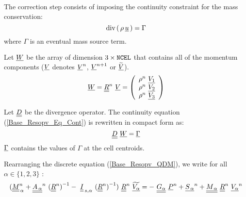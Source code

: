 The correction step consists of imposing the continuity constraint for the mass conservation:
\begin{equation}\label{Base_Resopv_Eq_Cont}
\text{div}\,(\,{\rho\,\underline{u}}\,) = \Gamma
\end{equation}
where $\Gamma$ is an eventual mass source term.

Let $\underline{W}$ be the array of dimension $3 \times \text{\texttt{NCEL}}$ that contains all of the momentum components ($\underline{V}$ denotes $\underline{V}^n$, $\underline{V}^{n+1}$ or $\widetilde{\underline{V}}$).
$$ \underline{W} = \underline{\underline{R}}^n\ \underline{V} = \left(
                    \begin{array} {c}
                    \rho^n\ \underline{V_1} \\
                    \rho^n\ \underline{V_2} \\
                    \rho^n\ \underline{V_3}
                    \end{array}
              \right)
$$

Let $\underline{\underline{D}}$ be the divergence operator.
The continuity equation (\ref{Base_Resopv_Eq_Cont}) is rewritten in compact form as:
\begin{equation}\notag
\underline{\underline{D}}\ \underline{W} = \underline{\Gamma}
\end{equation}
$\underline{\Gamma}$ contains the values of $\Gamma$ at the cell centroids.

Rearranging the discrete equation (\ref{Base_Resopv_QDM}), we write for all $\alpha \in \{1,2,3\}$ :
\begin{equation}
\displaystyle
(\tens{M}_{\,\alpha}^n + \tens{A_{\,\alpha}}^n\ {(\tens{R}^{n})}^{-1} -\ \tens{I}_{\,s,\alpha}\ {(\tens{R}^n)}^{-1})\ \tens{R}^n\ \widetilde{\vect{V_\alpha}} = -\ \tens{G_\alpha}\ \vect{P}^n + \vect{S_{\,\alpha}}^n + \tens{M_{\,\alpha}}\ \tens{R}^n\ \vect{V_\alpha}^n
\label{Base_Resopv_eqn2}
\end{equation}

